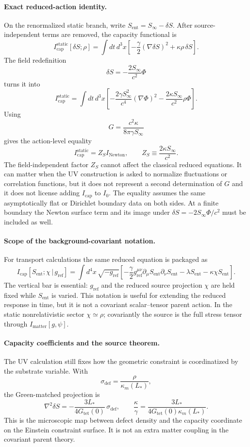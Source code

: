 \documentclass[11pt]{article}
\begin{document}
\paragraph{Exact reduced-action identity.}
On the renormalized static branch, write $S_{\mathrm{ent}}=S_\infty-\delta S$. After source-independent terms are removed, the capacity functional is
\[
I_{\mathrm{cap}}^{\mathrm{static}}[\delta S;\rho]
=
\int dt\,d^3x
\left[
-\frac{\gamma}{2}(\nabla\delta S)^2
+\kappa\rho\,\delta S
\right].
\]
The field redefinition
\[
\delta S=-\frac{2S_\infty}{c^2}\Phi
\]
turns it into
\[
I_{\mathrm{cap}}^{\mathrm{static}}
=
\int dt\,d^3x
\left[
-\frac{2\gamma S_\infty^2}{c^4}(\nabla\Phi)^2
-\frac{2\kappa S_\infty}{c^2}\rho\Phi
\right].
\]
Using
\[
G=\frac{c^2\kappa}{8\pi\gamma S_\infty}
\]
gives the action-level equality
\[
\boxed{
I_{\mathrm{cap}}^{\mathrm{static}}
=Z_S I_{\mathrm{Newton}},
\qquad
Z_S\equiv\frac{2\kappa S_\infty}{c^2}.
}
\]
The field-independent factor $Z_S$ cannot affect the classical reduced equations. It can matter when the UV construction is asked to normalize fluctuations or correlation functions, but it does not represent a second determination of $G$ and it does not license adding $I_{\mathrm{cap}}$ to $I_0$.
The equality assumes the same asymptotically flat or Dirichlet boundary data on both sides. At a finite boundary the Newton surface term and its image under $\delta S=-2S_\infty\Phi/c^2$ must be included as well.

\paragraph{Scope of the background-covariant notation.}
For transport calculations the same reduced equation is packaged as
\[
I_{\mathrm{cap}}[S_{\mathrm{ent}};\chi\,|\,g_{\mathrm{ref}}]
=
\int d^4x\,\sqrt{-g_{\mathrm{ref}}}
\left[
-\frac{\gamma}{2}g_{\mathrm{ref}}^{\mu\nu}
\partial_\mu S_{\mathrm{ent}}\partial_\nu S_{\mathrm{ent}}
-\lambda S_{\mathrm{ent}}-\kappa\chi S_{\mathrm{ent}}
\right].
\]
The vertical bar is essential: $g_{\mathrm{ref}}$ and the reduced source projection $\chi$ are held fixed while $S_{\mathrm{ent}}$ is varied. This notation is useful for extending the reduced response in time, but it is not a covariant scalar--tensor parent action. In the static nonrelativistic sector $\chi\simeq\rho$; covariantly the source is the full stress tensor through $I_{\mathrm{matter}}[g,\psi]$.

\paragraph{Capacity coefficients and the source theorem.}
The UV calculation still fixes how the geometric constraint is coordinatized by the substrate variable. With
\[
\sigma_{\mathrm{def}}=\frac{\rho}{\kappa_m(L_*)},
\]
the Green-matched projection is
\[
\nabla^2\delta S
=-\frac{3L_*}{4G_{\mathrm{tet}}(0)}\,\sigma_{\mathrm{def}},
\qquad
\frac{\kappa}{\gamma}
=\frac{3L_*}{4G_{\mathrm{tet}}(0)\kappa_m(L_*)}.
\]
This is the microscopic map between defect density and the capacity coordinate on the Einstein constraint surface. It is not an extra matter coupling in the covariant parent theory.
\end{document}

